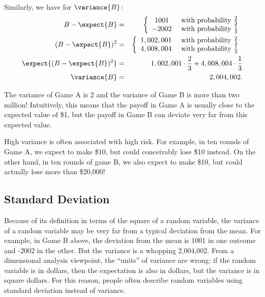 Similarly, we have for $\variance{B}$:
\begin{eqnarray*}
B - \expect{B}
        & = &   \left\{
                \begin{array}{cl}
                        1001 & \text{ with probability } \frac{2}{3} \\
                        -2002 & \text{ with probability } \frac{1}{3}
                \end{array}
                \right. \\
(B - \expect{B})^2
        & = &   \left\{
                \begin{array}{cl}
                        1,002,001 & \text{ with probability } \frac{2}{3} \\
                        4,008,004 & \text{ with probability } \frac{1}{3}
                \end{array}
                \right. \\
\expect{(B - \expect{B})^2}
        & = &   1,002,001 \cdot \frac{2}{3} + 4,008,004 \cdot \frac{1}{3} \\
\variance{B} & = & 2,004,002.
\end{eqnarray*}

The variance of Game A is 2 and the variance of Game B is more than
two million!  Intuitively, this means that the payoff in Game A is
usually close to the expected value of \$1, but the payoff in Game B
can deviate very far from this expected value.

High variance is often associated with high risk.  For example, in ten
rounds of Game A, we expect to make \$10, but could conceivably lose
\$10  instead.  On the other hand, in ten rounds of game B, we also
expect to make \$10, but could actually lose more than \$20,000!

\subsection{Standard Deviation}

Because of its definition in terms of the square of a random variable, the
variance of a random variable may be very far from a typical deviation
from the mean.  For example, in Game B above, the deviation from the mean
is 1001 in one outcome and -2002 in the other. But the variance is a
whopping 2,004,002.  From a dimensional analysis viewpoint, the ``units''
of variance are wrong: if the random variable is in dollars, then the
expectation is also in dollars, but the variance is in square dollars.
For this reason, people often describe random variables using standard
deviation instead of variance.

